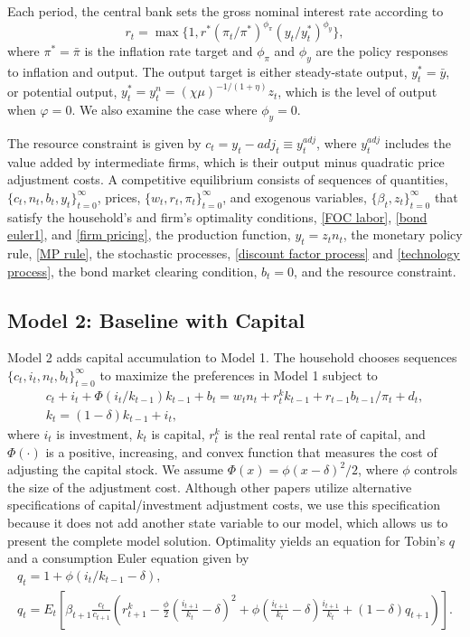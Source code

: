 \documentclass[12pt,final]{article}
\begin{document}
Each period, the central bank sets the gross nominal interest rate according to
\begin{equation}
  r_t=\max\{1,r^*(\pi_t/\pi^*)^{\phi_\pi}(y_t/y_t^*)^{\phi_y}\}, \label{MP rule}
\end{equation}
where $\pi^*=\bar{\pi}$ is the inflation rate target and $\phi_\pi$ and $\phi_y$ are the policy responses to inflation and output. The output target is either steady-state output, $y_t^*=\bar{y}$, or potential output, $y_t^*=y_t^n=(\chi\mu)^{-1/(1+\eta)}z_t$, which is the level of output when $\varphi=0$. We also examine the case where $\phi_{y}=0$.

The resource constraint is given by $c_t=y_t-adj_t\equiv y_t^{adj}$, where $y_t^{adj}$ includes the value added by intermediate firms, which is their output minus quadratic price adjustment costs. A competitive equilibrium consists of sequences of quantities, $\{c_t,n_t,b_t,y_t\}_{t=0}^\infty$, prices, $\{w_t,r_t,\pi_t\}_{t=0}^\infty$, and exogenous variables, $\{\beta_t,z_t\}_{t=0}^\infty$ that satisfy the household's and firm's optimality conditions, \eqref{FOC labor}, \eqref{bond euler1}, and \eqref{firm pricing}, the production function, $y_t=z_tn_t$, the monetary policy rule, \eqref{MP rule}, the stochastic processes, \eqref{discount factor process} and \eqref{technology process}, the bond market clearing condition, $b_t=0$, and the resource constraint.

\subsection{Model 2: Baseline with Capital}\label{sec:model2}

Model 2 adds capital accumulation to Model 1. The household chooses sequences $\{c_t,i_t,n_t,b_t\}_{t=0}^{\infty}$ to maximize the preferences in Model 1 subject to
\begin{gather}
  c_t+i_t+\Phi(i_t/k_{t-1})k_{t-1}+b_t=w_tn_t+r_t^kk_{t-1}+r_{t-1}b_{t-1}/\pi_t+d_t, \label{bc2}\\
  k_t=(1-\delta)k_{t-1}+i_t,  \label{inv2}
\end{gather}
where $i_t$ is investment, $k_t$ is capital, $r_t^k$ is the real rental rate of capital, and $\Phi(\cdot)$ is a positive, increasing, and convex function that measures the cost of adjusting the capital stock. We assume $\Phi(x)=\phi(x-\delta)^2/2$, where $\phi$ controls the size of the adjustment cost. Although other papers utilize alternative specifications of capital/investment adjustment costs, we use this specification because it does not add another state variable to our model, which allows us to present the complete model solution. Optimality yields an equation for Tobin's $q$ and a consumption Euler equation given by
\begin{gather}
  q_t=1+\phi(i_t/k_{t-1}-\delta), \label{Tobins q}\\
  q_t=E_t\left[\beta_{t+1}\frac{c_t}{c_{t+1}}\left(r_{t+1}^k-\frac{\phi}{2}\left(\frac{i_{t+1}}{k_t}-\delta\right)^2
    +\phi\left(\frac{i_{t+1}}{k_t}-\delta\right)\frac{i_{t+1}}{k_t}+(1-\delta)q_{t+1}\right)\right]. \label{FOC k}
\end{gather}
\end{document}
